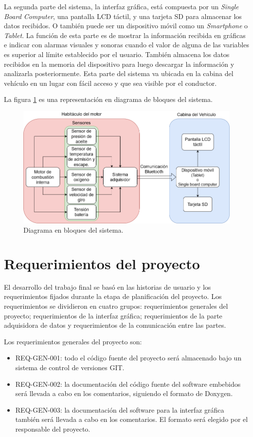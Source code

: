 La segunda parte del sistema, la interfaz gráfica, está compuesta por un \textit{Single Board Computer}, una pantalla LCD táctil, y una tarjeta SD para almacenar los datos recibidos. O también puede ser un dispositivo móvil como un \textit{Smartphone} o \textit{Tablet}. La función de esta parte es de mostrar la información recibida en gráficas e indicar con alarmas visuales y sonoras cuando el valor de alguna de las variables es superior al límite establecido por el usuario. También almacena los datos recibidos en la memoria del dispositivo para luego descargar la información y analizarla posteriormente. Esta parte del sistema va ubicada en la cabina del vehículo en un lugar con fácil acceso y que sea visible por el conductor.

La figura \ref{fig:diagrama-de-bloques} es una representación en diagrama de bloques del sistema.

\begin{figure}[htpb]
\centering
\includegraphics[width=.9\textwidth]{./Figures/diagrama-proyecto.png}
\caption{Diagrama en bloques del sistema.}
\label{fig:diagrama-de-bloques}
\end{figure}

\section{Requerimientos del proyecto}

El desarrollo del trabajo final se basó en las historias de usuario y los requerimientos fijados durante la etapa de planificación del proyecto. Los requerimientos se dividieron en cuatro grupos: requerimientos generales del proyecto; requerimientos de la interfaz gráfica; requerimientos de la parte adquisidora de datos y requerimientos de la comunicación entre las partes.

Los requerimientos generales del proyecto son:
\begin{itemize}
\item REQ-GEN-001: todo el código fuente del proyecto será almacenado bajo un sistema de control de versiones GIT.
\item REQ-GEN-002: la documentación del código fuente del software embebidos será llevada a cabo en los comentarios, siguiendo el formato de Doxygen.
\item REQ-GEN-003: la documentación del software para la interfaz gráfica también será llevada a cabo en los comentarios. El formato será elegido por el responsable del proyecto.
\end{itemize}

